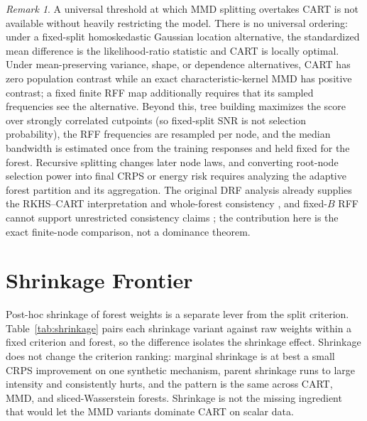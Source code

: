 \documentclass[11pt]{article}
\theoremstyle{remark}
\newtheorem{remark}{Remark}
\begin{document}
\begin{remark}\label{rem:hard}
A universal threshold at which MMD splitting overtakes CART is not available
without heavily restricting the model.  There is no universal ordering: under a
fixed-split homoskedastic Gaussian location alternative, the standardized mean
difference is the likelihood-ratio statistic and CART is locally optimal.
Under mean-preserving variance, shape, or dependence alternatives, CART has zero
population contrast while an exact characteristic-kernel MMD has positive
contrast; a fixed finite RFF map additionally requires that its sampled
frequencies see the alternative.  Beyond this, tree building
maximizes the score over strongly correlated cutpoints (so fixed-split SNR is not
selection probability), the RFF frequencies are resampled per node, and the
median bandwidth is estimated once from the training responses and held fixed
for the forest.  Recursive splitting changes later node laws, and converting
root-node selection power into final CRPS or energy risk requires analyzing the
adaptive forest partition and its aggregation.  The original DRF
analysis already supplies the RKHS--CART interpretation and whole-forest
consistency \citep{cevid2022}, and fixed-$B$ RFF cannot support unrestricted
consistency claims \citep{choi2024}; the contribution here is the exact
finite-node comparison, not a dominance theorem.
\end{remark}

\section{Shrinkage Frontier}

Post-hoc shrinkage of forest weights is a separate lever from the split
criterion.  Table~\ref{tab:shrinkage} pairs each shrinkage variant against raw
weights within a fixed criterion and forest, so the difference isolates the
shrinkage effect.  Shrinkage does not change the criterion ranking: marginal
shrinkage is at best a small CRPS improvement on one synthetic mechanism, parent
shrinkage runs to large intensity and consistently hurts, and the pattern is the
same across CART, MMD, and sliced-Wasserstein forests.  Shrinkage is not the
missing ingredient that would let the MMD variants dominate CART on scalar data.





\end{document}
